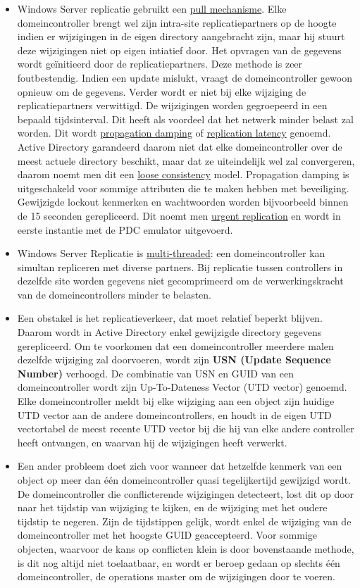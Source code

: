 \begin{enumerate}
{\begin{itemize}
				\item Windows Server replicatie gebruikt een \underline{pull mechanisme}.  Elke domeincontroller brengt wel zijn intra-site replicatiepartners op de hoogte indien er wijzigingen in de eigen directory aangebracht zijn, maar hij stuurt deze wijzigingen niet op eigen intiatief door. Het opvragen van de gegevens wordt geïnitieerd door de replicatiepartners. Deze methode is zeer foutbestendig. Indien een update mislukt, vraagt de domeincontroller gewoon opnieuw om de gegevens. Verder wordt er niet bij elke wijziging de replicatiepartners verwittigd. De wijzigingen worden gegroepeerd in een bepaald tijdsinterval. Dit heeft als voordeel dat het netwerk minder belast zal worden. Dit wordt \underline{propagation damping} of \underline{replication latency} genoemd. Active Directory garandeerd daarom niet dat elke domeincontroller over de meest actuele directory beschikt, maar dat ze uiteindelijk wel zal convergeren, daarom noemt men dit een \underline{loose consistency} model. Propagation damping is uitgeschakeld voor sommige attributen die te maken hebben met beveiliging. Gewijzigde lockout kenmerken en wachtwoorden worden bijvoorbeeld binnen de 15 seconden gerepliceerd. Dit noemt men \underline{urgent replication} en wordt in eerste instantie met de PDC emulator uitgevoerd. 
				\item Windows Server Replicatie is \underline{multi-threaded}: een domeincontroller kan simultan repliceren met diverse partners. Bij replicatie tussen controllers in dezelfde site worden gegevens niet gecomprimeerd om de verwerkingskracht van de domeincontrollers minder te belasten. 
				\item Een obstakel is het replicatieverkeer, dat moet relatief beperkt blijven. Daarom wordt in Active Directory enkel gewijzigde directory gegevens gerepliceerd. Om te voorkomen dat een domeincontroller meerdere malen dezelfde wijziging zal doorvoeren, wordt zijn \textbf{USN (Update Sequence Number)} verhoogd. De combinatie van USN en GUID van een domeincontroller wordt zijn Up-To-Dateness Vector (UTD vector) genoemd. Elke domeincontroller meldt bij elke wijziging aan een object zijn huidige UTD vector aan de andere domeincontrollers, en houdt in de eigen UTD vectortabel de meest recente UTD vector bij die hij van elke andere controller heeft ontvangen, en waarvan hij de wijzigingen heeft verwerkt.
				\item Een ander probleem doet zich voor wanneer dat hetzelfde kenmerk van een object op meer dan één domeincontroller quasi tegelijkertijd gewijzigd wordt. De domeincontroller die conflicterende wijzigingen detecteert, lost dit op door naar het tijdstip van wijziging te kijken, en de wijziging met het oudere tijdstip te negeren. Zijn de tijdstippen gelijk, wordt enkel de wijziging van de domeincontroller met het hoogste GUID geaccepteerd. Voor sommige objecten, waarvoor de kans op conflicten klein is door bovenstaande methode, is dit nog altijd niet toelaatbaar, en wordt er beroep gedaan op slechts één domeincontroller, de operations master om de wijzigingen door te voeren.

\end{itemize}}
\end{enumerate}
